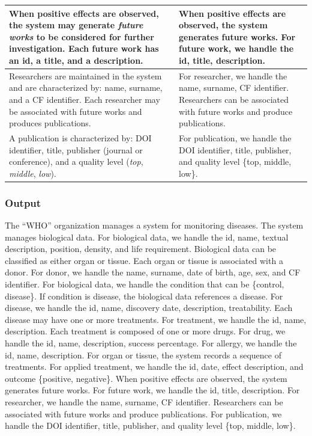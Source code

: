 \documentclass[11pt,a4paper]{article}
\begin{document}
\begin{tabularx}{\textwidth}{|X|X|}
\hline
When positive effects are observed, the system may generate \textit{future works} to be considered for further investigation. Each future work has an id, a title, and a description. &
When positive effects are observed, the system generates future works. For future work, we handle the id, title, description. \\
\hline
Researchers are maintained in the system and are characterized by: name, surname, and a CF identifier. Each researcher may be associated with future works and produces publications. &
For researcher, we handle the name, surname, CF identifier. Researchers can be associated with future works and produce publications. \\
\hline
A publication is characterized by: DOI identifier, title, publisher (journal or conference), and a quality level (\textit{top}, \textit{middle}, \textit{low}). &
For publication, we handle the DOI identifier, title, publisher, and quality level \{top, middle, low\}. \\
\hline
\end{tabularx}

\subsubsection{Output}

The ``WHO'' organization manages a system for monitoring diseases. The system manages biological data. For biological data, we handle the id, name, textual description, position, density, and life requirement. Biological data can be classified as either organ or tissue. Each organ or tissue is associated with a donor. For donor, we handle the name, surname, date of birth, age, sex, and CF identifier. For biological data, we handle the condition that can be \{control, disease\}. If condition is disease, the biological data references a disease. For disease, we handle the id, name, discovery date, description, treatability. Each disease may have one or more treatments. For treatment, we handle the id, name, description. Each treatment is composed of one or more drugs. For drug, we handle the id, name, description, success percentage. For allergy, we handle the id, name, description. For organ or tissue, the system records a sequence of treatments. For applied treatment, we handle the id, date, effect description, and outcome \{positive, negative\}. When positive effects are observed, the system generates future works. For future work, we handle the id, title, description. For researcher, we handle the name, surname, CF identifier. Researchers can be associated with future works and produce publications. For publication, we handle the DOI identifier, title, publisher, and quality level \{top, middle, low\}.
\end{document}
